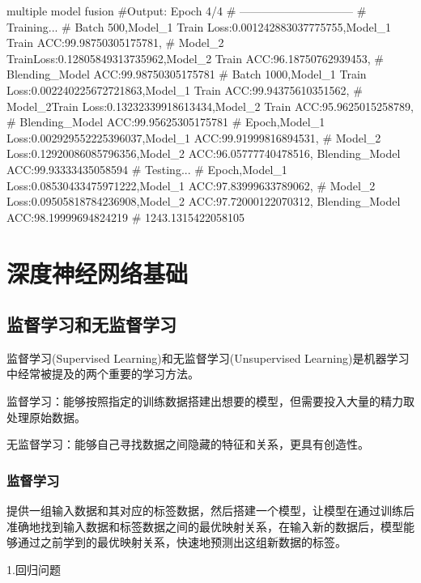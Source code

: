 \documentclass[openbib]{article}
\begin{document}
\begin{Python}{multiple model fusion}
#Output: Epoch 4/4
#		------------------------------
#		Training...
#		Batch 500,Model_1 Train Loss:0.001242883037775755,Model_1 Train ACC:99.98750305175781,
#		Model_2 TrainLoss:0.12805849313735962,Model_2 Train ACC:96.18750762939453,                
#		Blending_Model ACC:99.98750305175781
#		Batch 1000,Model_1 Train Loss:0.002240225672721863,Model_1 Train ACC:99.94375610351562,
#		Model_2Train Loss:0.13232339918613434,Model_2 Train ACC:95.9625015258789,               
#		Blending_Model ACC:99.95625305175781
#		Epoch,Model_1 Loss:0.002929552225396037,Model_1 ACC:99.91999816894531,
#		Model_2  Loss:0.12920086085796356,Model_2  ACC:96.05777740478516, Blending_Model ACC:99.93333435058594
#		Testing...
#		Epoch,Model_1 Loss:0.08530433475971222,Model_1 ACC:97.83999633789062,
#		Model_2  Loss:0.09505818784236908,Model_2  ACC:97.72000122070312, Blending_Model ACC:98.19999694824219
#		1243.1315422058105

\end{Python}




\section{深度神经网络基础}
\subsection{监督学习和无监督学习}

监督学习(Supervised Learning)和无监督学习(Unsupervised Learning)是机器学习中经常被提及的两个重要的学习方法。

监督学习：能够按照指定的训练数据搭建出想要的模型，但需要投入大量的精力取处理原始数据。

无监督学习：能够自己寻找数据之间隐藏的特征和关系，更具有创造性。
\subsubsection{监督学习}
提供一组输入数据和其对应的标签数据，然后搭建一个模型，让模型在通过训练后准确地找到输入数据和标签数据之间的最优映射关系，在输入新的数据后，模型能够通过之前学到的最优映射关系，快速地预测出这组新数据的标签。
\begin{center}
	1.回归问题
\end{center}
\end{document}
